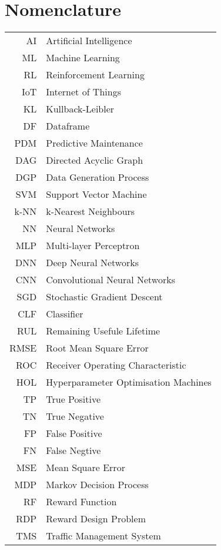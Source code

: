 \chapter*{Nomenclature}
    \thispagestyle{empty}
    \begin{center}
        \begin{tabular}{r l}
         AI & Artificial Intelligence \\
         ML & Machine Learning \\ 
         RL & Reinforcement Learning \\
         IoT & Internet of Things \\
         KL & Kullback-Leibler \\
         DF & Dataframe \\
         PDM & Predictive Maintenance \\
         DAG & Directed Acyclic Graph \\
         DGP & Data Generation Process \\
         SVM & Support Vector Machine \\
         k-NN & k-Nearest Neighbours \\
         NN & Neural Networks \\
         MLP & Multi-layer Perceptron \\
         DNN & Deep Neural Networks \\
         CNN & Convolutional Neural Networks \\
         SGD & Stochastic Gradient Descent \\
         CLF & Classifier \\
         RUL & Remaining Usefule Lifetime \\
         RMSE & Root Mean Square Error \\
         ROC & Receiver Operating Characteristic \\
         HOL & Hyperparameter Optimisation Machines \\
         TP & True Positive \\
         TN & True Negative \\
         FP & False Positive \\
         FN & False Negtive \\
         MSE & Mean Square Error \\
         MDP & Markov Decision Process \\
         RF & Reward Function \\
         RDP & Reward Design Problem \\
         TMS & Traffic Management System \\
        \end{tabular}
    \end{center}